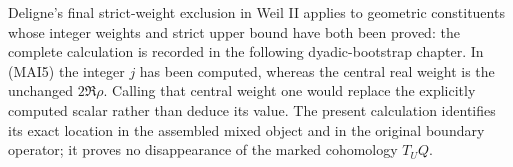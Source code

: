 Deligne's final strict-weight exclusion in Weil II applies to
geometric constituents whose integer weights and strict upper
bound have both been proved: the complete calculation is
recorded in the following dyadic-bootstrap chapter. In (MAI5)
the integer $j$ has been computed, whereas the central real
weight is the unchanged $2\Re\rho$. Calling that central weight
one would replace the explicitly computed scalar rather than
deduce its value. The present calculation identifies its exact
location in the assembled mixed object and in the original
boundary operator; it proves no disappearance of the marked
cohomology $T_UQ$.
